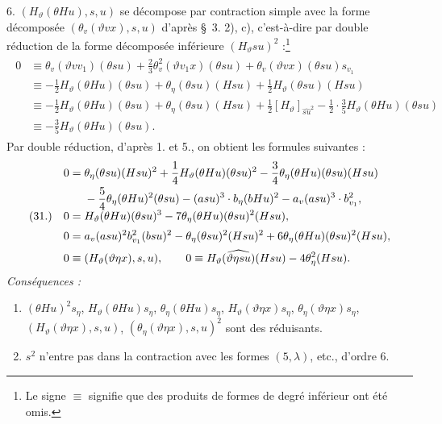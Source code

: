 \documentclass[11pt]{article}
\begin{document}
6. $(H_\vartheta(\theta Hu),s,u)$ se décompose par contraction simple avec la forme décomposée $(\theta_v(\vartheta v x),s,u)$ d'après \S\ 3. 2), c), c'est-à-dire par double réduction de la forme décomposée inférieure $(H_\vartheta su)^2$ :\footnote{Le signe $\equiv$ signifie que des produits de formes de degré inférieur ont été omis.}
\begin{align*}
\begin{aligned}
0&\equiv \theta_v(\vartheta vv_1)(\theta su)+\frac23\theta_v^2(\vartheta v_1 x)(\theta su)+\theta_v(\vartheta v x)(\theta su)s_{v_1}\\
&\equiv -\frac12H_\vartheta(\theta Hu)(\theta su)+\theta_\eta(\theta su)(Hsu)+\frac12H_\vartheta(\theta su)(Hsu)\\
&\equiv -\frac12H_\vartheta(\theta Hu)(\theta su)+\theta_\eta(\theta su)(Hsu)+\frac12[H_\vartheta]_{\widehat{su}^2}-\frac12\cdot\frac35H_\vartheta(\theta Hu)(\theta su)\\
&\equiv -\frac35H_\vartheta(\theta Hu)(\theta su).
\end{aligned}
\end{align*}
Par double réduction, d'après 1. et 5., on obtient les formules suivantes :
\[
\begin{array}{@{}r@{\quad}l@{}}
&\displaystyle
\begin{aligned}
0={}&\theta_\eta(\theta su)(Hsu)^2+\frac14H_\vartheta(\theta Hu)(\theta su)^2-\frac34\theta_\eta(\theta Hu)(\theta su)(Hsu)\\
&-\frac54\theta_\eta(\theta Hu)^2(\theta su)-(asu)^3\cdot b_\eta(bHu)^2-a_v(asu)^3\cdot b_{v_1}^2,
\end{aligned}\\[0.55em]
(31.)&\displaystyle 0=H_\vartheta(\theta Hu)(\theta su)^3-7\theta_\eta(\theta Hu)(\theta su)^2(Hsu),\\[0.55em]
&\displaystyle 0=a_v(asu)^2b_{v_1}^{2}(bsu)^2-\theta_\eta(\theta su)^2(Hsu)^2+6\theta_\eta(\theta Hu)(\theta su)^2(Hsu),\\[0.55em]
&\displaystyle 0\equiv (H_\vartheta(\vartheta\eta x),s,u),\qquad
0\equiv H_\vartheta(\widehat{\vartheta\eta su})(Hsu)-4\theta_\eta^2(Hsu).
\end{array}
\]
\noindent\emph{Conséquences :}
\begin{enumerate}
\item $(\theta Hu)^2s_\eta$, $H_\vartheta(\theta Hu)s_\eta$, $\theta_\eta(\theta Hu)s_\eta$, $H_\vartheta(\vartheta\eta x)s_\eta$, $\theta_\eta(\vartheta\eta x)s_\eta$, $(H_\vartheta(\vartheta\eta x),s,u)$, $(\theta_\eta(\vartheta\eta x),s,u)^2$ sont des réduisants.
\item $s^2$ n'entre pas dans la contraction avec les formes $(5,\lambda)$, etc., d'ordre 6.
\end{enumerate}
\end{document}

